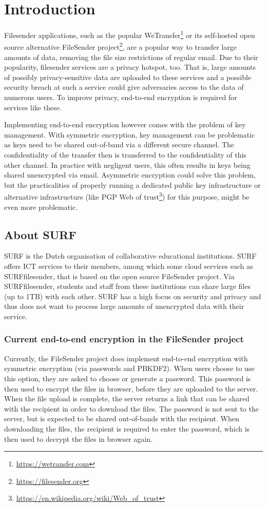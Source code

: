 \chapter{Introduction}\label{ch:introduction}
Filesender applications, such as the popular WeTransfer\footnote{\url{https://wetransfer.com}} or its self-hosted open source alternative FileSender project\footnote{\url{https://filesender.org}}, are a popular way to transfer large amounts of data, removing the file size restrictions of regular email.
Due to their popularity, filesender services are a privacy hotspot, too.
That is, large amounts of possibly privacy-sensitive data are uploaded to these services and a possible security breach at such a service could give adversaries access to the data of numerous users.
To improve privacy, end-to-end encryption is required for services like these.

Implementing end-to-end encryption however comes with the problem of key management.
With symmetric encryption, key management can be problematic as keys need to be shared out-of-band via a different secure channel.
The confidentiality of the transfer then is transferred to the confidentiality of this other channel.
In practice with negligent users, this often results in keys being shared unencrypted via email.
Asymmetric encryption could solve this problem, but the practicalities of properly running a dedicated public key infrastructure or alternative infrastructure (like PGP Web of trust\footnote{\url{https://en.wikipedia.org/wiki/Web_of_trust}}) for this purpose, might be even more problematic.

\section{About SURF}\label{sec:about-surf}
SURF is the Dutch organisation of collaborative educational institutions.
SURF offers ICT services to their members, among which some cloud services such as SURFfilesender, that is based on the open source FileSender project.
Via SURFfilesender, students and staff from these institutions can share large files (up to 1TB) with each other.
SURF has a high focus on security and privacy and thus does not want to process large amounts of unencrypted data with their service.

\subsection{Current end-to-end encryption in the FileSender project}\label{subsec:current-end-to-end-encryption-in-the-filesender-project}
Currently, the FileSender project does implement end-to-end encryption with symmetric encryption (via passwords and PBKDF2).
When users choose to use this option, they are asked to choose or generate a password.
This password is then used to encrypt the files in browser, before they are uploaded to the server.
When the file upload is complete, the server returns a link that can be shared with the recipient in order to download the files.
The password is not sent to the server, but is expected to be shared out-of-bands with the recipient.
When downloading the files, the recipient is required to enter the password, which is then used to decrypt the files in browser again.

